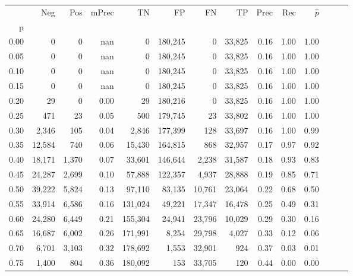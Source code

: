 \begin{tabular}{rrrrrrrrrrrrrr}
\toprule
{} &     Neg &    Pos & mPrec &       TN &       FP &      FN &      TP &  Prec &   Rec & $\hat{p}$ \\
p    &         &        &       &          &          &         &         &       &       &           \\
\midrule
0.00 &       0 &      0 &   nan &        0 &  180,245 &       0 &  33,825 &  0.16 &  1.00 &      1.00 \\
0.05 &       0 &      0 &   nan &        0 &  180,245 &       0 &  33,825 &  0.16 &  1.00 &      1.00 \\
0.10 &       0 &      0 &   nan &        0 &  180,245 &       0 &  33,825 &  0.16 &  1.00 &      1.00 \\
0.15 &       0 &      0 &   nan &        0 &  180,245 &       0 &  33,825 &  0.16 &  1.00 &      1.00 \\
0.20 &      29 &      0 &  0.00 &       29 &  180,216 &       0 &  33,825 &  0.16 &  1.00 &      1.00 \\
0.25 &     471 &     23 &  0.05 &      500 &  179,745 &      23 &  33,802 &  0.16 &  1.00 &      1.00 \\
0.30 &   2,346 &    105 &  0.04 &    2,846 &  177,399 &     128 &  33,697 &  0.16 &  1.00 &      0.99 \\
0.35 &  12,584 &    740 &  0.06 &   15,430 &  164,815 &     868 &  32,957 &  0.17 &  0.97 &      0.92 \\
0.40 &  18,171 &  1,370 &  0.07 &   33,601 &  146,644 &   2,238 &  31,587 &  0.18 &  0.93 &      0.83 \\
0.45 &  24,287 &  2,699 &  0.10 &   57,888 &  122,357 &   4,937 &  28,888 &  0.19 &  0.85 &      0.71 \\
0.50 &  39,222 &  5,824 &  0.13 &   97,110 &   83,135 &  10,761 &  23,064 &  0.22 &  0.68 &      0.50 \\
0.55 &  33,914 &  6,586 &  0.16 &  131,024 &   49,221 &  17,347 &  16,478 &  0.25 &  0.49 &      0.31 \\
0.60 &  24,280 &  6,449 &  0.21 &  155,304 &   24,941 &  23,796 &  10,029 &  0.29 &  0.30 &      0.16 \\
0.65 &  16,687 &  6,002 &  0.26 &  171,991 &    8,254 &  29,798 &   4,027 &  0.33 &  0.12 &      0.06 \\
0.70 &   6,701 &  3,103 &  0.32 &  178,692 &    1,553 &  32,901 &     924 &  0.37 &  0.03 &      0.01 \\
0.75 &   1,400 &    804 &  0.36 &  180,092 &      153 &  33,705 &     120 &  0.44 &  0.00 &      0.00 \\

\end{tabular}
